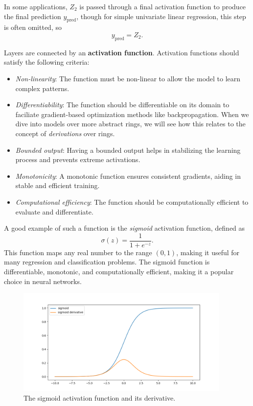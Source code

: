\begin{enumerate}
    In some applications, $Z_2$ is passed through a final activation function to produce the final prediction $y_{\text{pred}}$, though for simple univariate linear regression, this step is often omitted, so 
    $$y_{\text{pred}} = Z_2.$$

\end{enumerate}

Layers are connected by an \textbf{activation function}. Activation functions should satisfy the following criteria:
\begin{itemize}
    \item \emph{Non-linearity}: The function must be non-linear to allow the model to learn complex patterns.
    \item \emph{Differentiability}: The function should be differentiable on its domain to faciliate gradient-based optimization methods like backpropagation. When we dive into models over more abstract rings, we will see how this relates to the concept of \emph{derivations} over rings.
    \item \emph{Bounded output}: Having a bounded output helps in stabilizing the learning process and prevents extreme activations.
    \item \emph{Monotonicity}: A monotonic function ensures consistent gradients, aiding in stable and efficient training.
    \item \emph{Computational efficiency}: The function should be computationally efficient to evaluate and differentiate.
\end{itemize}

A good example of such a function is the \emph{sigmoid} activation function, defined as $$\sigma(z) = \frac{1}{1 + e^{-z}}.$$ This function maps any real number to the range $(0,1)$, making it useful for many regression and classification problems. The sigmoid function is differentiable, monotonic, and computationally efficient, making it a popular choice in neural networks.

\begin{figure}[H]
\centering
\includegraphics[width=300pt]{Regression/code/sigmoid.png}
\caption{The sigmoid activation function and its derivative.}
\label{fig:linear9}
\end{figure}


